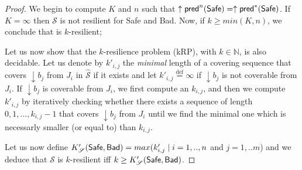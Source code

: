 	\begin{proof}

We begin to compute $K$ and $n$ such that $ \uparrow \textsf{pred}^n(\textsf{Safe})=  \uparrow \textsf{pred}^*(\textsf{Safe})$.
If $K=\infty$ then $\mathscr{S}$ is not resilient for Safe and Bad.
Now, if $k \geq min(K,n)$, we conclude that is $k$-resilient; 
\fi

Let us now show that the $k$-resilience problem (kRP), with $k \in \mathbb{N}$, is also decidable.
Let us denote by $k'_{i,j}$ the \emph{minimal} length of a covering sequence that covers $\downarrow b_j$ from $J_i$ in $\hat{\mathscr{S}}$ if it exists and let $k'_{i,j}\stackrel{\text{def}}{=}\infty$ if $\downarrow b_j$ is not coverable from $J_i$. 
If $\downarrow b_j$ is coverable from $J_i$, we first compute an $k_{i,j}$, and then we compute $k'_{i,j}$ by iteratively checking whether there exists a sequence of length $0,1,...,k_{i,j}-1$ that covers $\downarrow b_j$ from $J_i$ until we find the minimal one which is necessarly smaller (or equal to) than $k_{i,j}$.

Let us now define $K'_{\mathscr{S}}(\textsf{Safe},\textsf{Bad})=max(k'_{i,j} \mid i=1,..,n$ and $j= 1,..m$) and we deduce that  $\mathscr{S}$ is $k$-resilient iff $k \geq K'_{\mathscr{S}}(\textsf{Safe},\textsf{Bad})$.

\end{proof}

%




